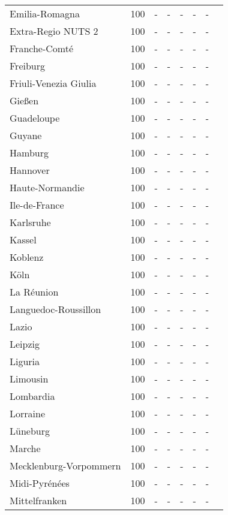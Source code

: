 \begin{table}[H]
\begin{tabularx}{\textwidth}{Xccccccc}
            Emilia-Romagna & 100 & - & - & - & - & - \\
            Extra-Regio NUTS 2 & 100 & - & - & - & - & - \\
            Franche-Comté & 100 & - & - & - & - & - \\
            Freiburg & 100 & - & - & - & - & - \\
            Friuli-Venezia Giulia & 100 & - & - & - & - & - \\
            Gießen & 100 & - & - & - & - & - \\
            Guadeloupe & 100 & - & - & - & - & - \\
            Guyane & 100 & - & - & - & - & - \\
            Hamburg & 100 & - & - & - & - & - \\
            Hannover & 100 & - & - & - & - & - \\
            Haute-Normandie  & 100 & - & - & - & - & - \\
            Ile-de-France & 100 & - & - & - & - & - \\
            Karlsruhe & 100 & - & - & - & - & - \\
            Kassel & 100 & - & - & - & - & - \\
            Koblenz & 100 & - & - & - & - & - \\
            Köln & 100 & - & - & - & - & - \\
            La Réunion  & 100 & - & - & - & - & - \\
            Languedoc-Roussillon & 100 & - & - & - & - & - \\
            Lazio & 100 & - & - & - & - & - \\
            Leipzig & 100 & - & - & - & - & - \\
            Liguria & 100 & - & - & - & - & - \\
            Limousin & 100 & - & - & - & - & - \\
            Lombardia & 100 & - & - & - & - & - \\
            Lorraine & 100 & - & - & - & - & - \\
            Lüneburg & 100 & - & - & - & - & - \\
            Marche & 100 & - & - & - & - & - \\
            Mecklenburg-Vorpommern & 100 & - & - & - & - & - \\
            Midi-Pyrénées & 100 & - & - & - & - & - \\
            Mittelfranken & 100 & - & - & - & - & - \\

\end{tabularx}
\end{table}
